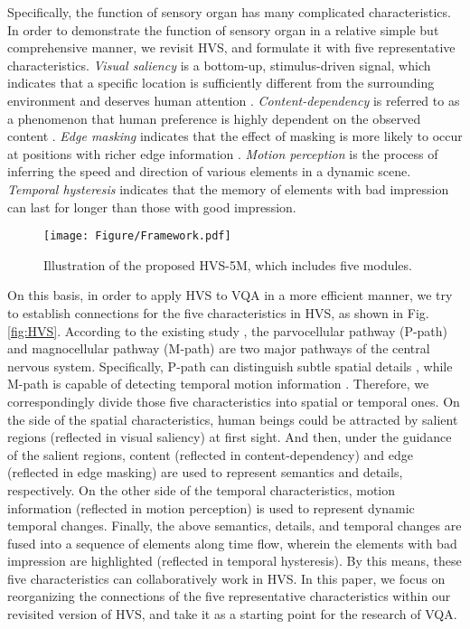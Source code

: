 \documentclass[journal]{IEEEtran}
\begin{document}
Specifically, the function of sensory organ has many complicated characteristics.
In order to demonstrate the function of sensory organ in a relative simple but comprehensive manner,
we revisit HVS, and formulate it with five representative characteristics.
\textit{Visual saliency} is a bottom-up, stimulus-driven signal, which indicates that a specific location is sufficiently different from the surrounding environment and deserves human attention \cite{Visual Saliency1}. \textit{Content-dependency} is referred to as a phenomenon that human preference is highly dependent on the observed content \cite{content-dependency4}.
\textit{Edge masking} indicates that the effect of masking is more likely to occur at positions with richer edge information \cite{Edge Masking}.
\textit{Motion perception} is the process of inferring the speed and direction of various elements in a dynamic scene.
\textit{Temporal hysteresis} \cite{Temporal-Memory} indicates that
the memory of elements with bad impression can last for longer than those with good impression.






\begin{figure*}[t]\centering
\setlength{\belowcaptionskip}{-0.18cm}
{\texttt{[image: Figure/Framework.pdf]}}
\caption{Illustration of the proposed HVS-5M, which includes five modules.}\label{framework}
\end{figure*}


On this basis, in order to apply HVS to VQA in a more efficient manner, we try to establish connections for the five characteristics in HVS, as shown in Fig. \ref{fig:HVS}.
According to the existing study \cite{P&M-path}, the parvocellular pathway (P-path) and magnocellular pathway (M-path) are two major pathways of the central nervous system.
Specifically, P-path can distinguish subtle spatial details \cite{P-cells}, while M-path is capable of detecting temporal motion information \cite{M-cells1}.
Therefore, we correspondingly divide those five characteristics into spatial or temporal ones.
On the side of the spatial characteristics, human beings could be attracted by salient regions (reflected in visual saliency) at first sight.
And then, under the guidance of the salient regions,
content (reflected in content-dependency) and edge (reflected in edge masking) are used to represent semantics and details, respectively.
On the other side of the temporal characteristics, motion information (reflected in motion perception)
is used to represent dynamic temporal changes.
Finally, the above semantics, details, and temporal changes are fused into a sequence of elements along time flow,
wherein the elements with bad impression are highlighted (reflected in temporal hysteresis).
By this means, these five characteristics can collaboratively work in HVS.
In this paper, we focus on reorganizing the connections of the five representative characteristics within our revisited version of HVS, and take it as a starting point for the research of VQA.
\end{document}
